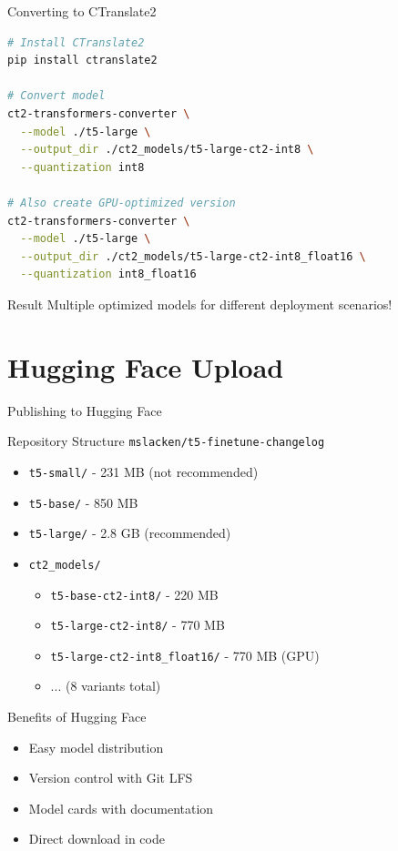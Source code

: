 \begin{frame}[fragile]{Converting to CTranslate2}
\begin{lstlisting}[language=bash, basicstyle=\ttfamily\small]
# Install CTranslate2
pip install ctranslate2

# Convert model
ct2-transformers-converter \
  --model ./t5-large \
  --output_dir ./ct2_models/t5-large-ct2-int8 \
  --quantization int8

# Also create GPU-optimized version
ct2-transformers-converter \
  --model ./t5-large \
  --output_dir ./ct2_models/t5-large-ct2-int8_float16 \
  --quantization int8_float16
\end{lstlisting}

\begin{block}{Result}
Multiple optimized models for different deployment scenarios!
\end{block}
\end{frame}

\section{Hugging Face Upload}
\begin{frame}{Publishing to Hugging Face}
\begin{block}{Repository Structure}
\texttt{mslacken/t5-finetune-changelog}
\begin{itemize}
  \item \texttt{t5-small/} - 231 MB (not recommended)
  \item \texttt{t5-base/} - 850 MB
  \item \texttt{t5-large/} - 2.8 GB (recommended)
  \item \texttt{ct2\_models/}
  \begin{itemize}
    \item \texttt{t5-base-ct2-int8/} - 220 MB
    \item \texttt{t5-large-ct2-int8/} - 770 MB
    \item \texttt{t5-large-ct2-int8\_float16/} - 770 MB (GPU)
    \item ... (8 variants total)
  \end{itemize}
\end{itemize}
\end{block}

\begin{block}{Benefits of Hugging Face}
\begin{itemize}
  \item Easy model distribution
  \item Version control with Git LFS
  \item Model cards with documentation
  \item Direct download in code
\end{itemize}
\end{block}
\end{frame}

